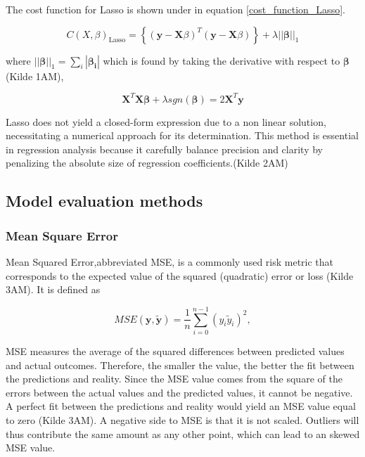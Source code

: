 \noindent The cost function for Lasso is shown under in equation \eqref{cost_function_Lasso}. 

\begin{equation} 
    C(X,\beta)_\text{Lasso} =  \left\lbrace ( \textbf{y} - \textbf{X}\beta )^T (\textbf{y} - \textbf{X}\beta)\right\rbrace + \lambda||\boldsymbol{\beta}||_1 \label{cost_function_Lasso} 
\end{equation}

\noindent where $||\boldsymbol{\beta}||_1 = \sum_{i} |\boldsymbol{\beta_i}|$ which is found by taking the derivative with respect to $\boldsymbol{\beta}$ (Kilde 1AM), 

\begin{equation}\label{eq: optimal_lasso}
    \mathbf{X}^T\mathbf{X}\boldsymbol{\beta} + \lambda sgn(\boldsymbol{\beta}) = 2\mathbf{X}^T\boldsymbol{y} \label{eq: optimal_lasso}
\end{equation}

\noindent Lasso does not yield a closed-form expression due to a non linear solution, necessitating a numerical approach for its
determination. 
This method is essential in regression analysis because it carefully balance precision and clarity by penalizing the absolute size of
regression coefficients.(Kilde 2AM)

\subsection{Model evaluation methods}
\subsubsection{Mean Square Error}

\noindent Mean Squared Error,abbreviated MSE, is a commonly used risk metric that corresponds to the expected value of the squared (quadratic) error or loss (Kilde 3AM). It is defined as 

\begin{equation} 
 MSE(\boldsymbol{y},\tilde{\boldsymbol{y}}) = \frac{1}{n} \sum_{i=0}^{n-1}(y_i \tilde{y}_i)^2,
 \label{MSE} 
\end{equation}

\noindent MSE measures the average of the squared differences between predicted values and actual outcomes. Therefore, the smaller the
value, the better the fit between the predictions and reality. Since the MSE value comes from the square of the errors between the actual
values and the predicted values, it cannot be negative. A perfect fit between the predictions and reality would yield an MSE value equal
to zero (Kilde 3AM). A negative side to MSE is that it is not scaled. Outliers will thus contribute the same amount as any other point,
which can lead to an skewed MSE value. 

